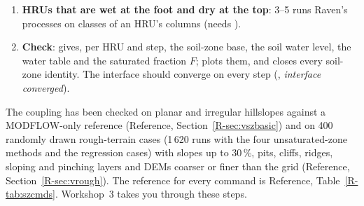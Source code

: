 \begin{enumerate}
recharge through the unsaturated zone between the soil and the water table, with its delay (Section~\ref{sec:uvadose}).
On hummocky ground  3 gives the hollows and the hummocks their own columns (Reference,
Section~\ref{R-sec:vzclasses}). Capillary rise from a shallow water table is then on by default.
Figure~\ref{fig:uszregimes} shows every position of the water table and what carries the water in each; the coupling
moves between them without any setting.
\item \textbf{HRUs that are wet at the foot and dry at the top}:  3--5 runs Raven's processes on
classes of an HRU's columns (needs ).
\item \textbf{Check}:  gives, per HRU and step, the soil-zone base, the soil water level, the water
table and the saturated fraction $F$;  plots them, and  closes every
soil-zone identity. The interface should converge on every step (, \emph{interface converged}).
\end{enumerate}
The coupling has been checked on planar and irregular hillslopes against a MODFLOW-only reference (Reference,
Section~\ref{R-sec:vszbasic}) and on 400 randomly drawn rough-terrain cases (1\,620 runs with the four unsaturated-zone
methods and the regression cases) with slopes up to 30\,\%, pits, cliffs, ridges, sloping and pinching layers and DEMs
coarser or finer than the grid (Reference, Section~\ref{R-sec:vrough}). The reference for every command is Reference,
Table~\ref{R-tab:szcmds}. Workshop~3 takes you through these steps.

